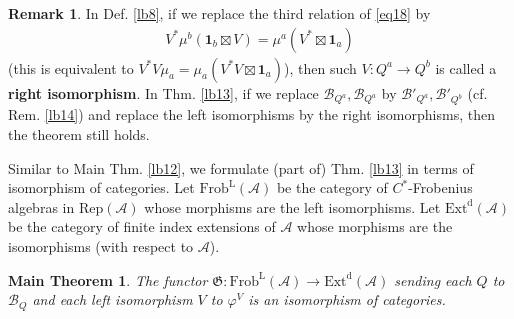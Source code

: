 \documentclass[11pt,b5paper,notitlepage]{article}
\theoremstyle{definition}
\newtheorem{rem}[df]{Remark}
\theoremstyle{plain}
\newtheorem{Mthm}{Main Theorem}
\newcommand{\fk}{\mathfrak}
\newcommand{\mc}{\mathcal}
\newcommand{\id}{\mathbf{1}}
\newcommand{\RepA}{\mathrm{Rep}(\mathcal A)}
\numberwithin{equation}{section}
\begin{document}
\begin{rem}
In Def. \ref{lb8}, if we replace the third relation of \eqref{eq18} by
\begin{align}
V^*\mu^b(\id_b\boxtimes V)=\mu^a(V^*\boxtimes\id_a)	
\end{align}
(this is equivalent to $V^*V\mu_a=\mu_a(V^*V\boxtimes\id_a)$), then such $V:Q^a\rightarrow Q^b$ is called a \textbf{right isomorphism}. In Thm. \ref{lb13}, if we replace $\mc B_{Q^a},\mc B_{Q^a}$  by $\mc B'_{Q^a},\mc B'_{Q^b}$   (cf. Rem. \ref{lb14}) and replace the left isomorphisms by the right isomorphisms, then the theorem still holds.
\end{rem}


Similar to Main Thm. \ref{lb12}, we formulate (part of) Thm. \ref{lb13} in terms of isomorphism of categories. Let $\mathrm{Frob}^{\mathrm L}(\mc A)$ be the category of $C^*$-Frobenius algebras in $\RepA$ whose morphisms are the left isomorphisms. Let $\mathrm{Ext}^{\mathrm d}(\mc A)$ be the category of finite index extensions of $\mc A$ whose morphisms are the isomorphisms (with respect to $\mc A$).

\begin{Mthm}\label{lb26}
The functor $\fk G:\mathrm{Frob}^{\mathrm L}(\mc A)\rightarrow\mathrm{Ext}^{\mathrm d}(\mc A)$ sending each $Q$ to $\mc B_Q$ and each left isomorphism $V$ to $\varphi^V$ is an isomorphism of categories.
\end{Mthm}
\end{document}
